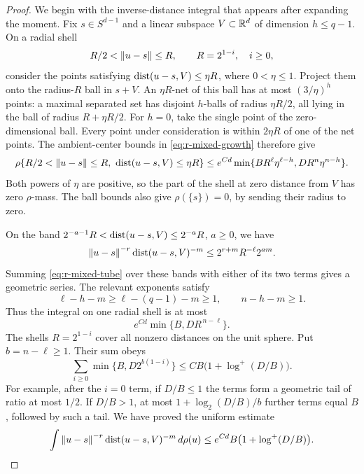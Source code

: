 \begin{proof}
We begin with the inverse-distance integral that appears after
expanding the moment.  Fix \(s\in S^{d-1}\) and a linear subspace
\(V\subset\mathbb R^d\) of dimension \(h\le q-1\).  On a radial shell
\[
 R/2<\left\lVert u-s\right\rVert\le R,\qquad R=2^{1-i},\quad i\ge0,
\]
consider the points satisfying
\(\operatorname{dist}(u-s,V)\le\eta R\), where \(0<\eta\le1\).  Project them
onto the radius-\(R\) ball in \(s+V\).  An \(\eta R\)-net of this
ball has at most \((3/\eta)^h\) points: a maximal separated set
has disjoint \(h\)-balls of radius \(\eta R/2\), all lying in the
ball of radius \(R+\eta R/2\).  For \(h=0\), take the single
point of the zero-dimensional ball.  Every point under consideration
is within \(2\eta R\) of one of the net points.  The ambient-center
bounds in \eqref{eq:r-mixed-growth} therefore give
\begin{equation}\label{eq:r-mixed-tube}
 \rho\{R/2<\left\lVert u-s\right\rVert\le R,\ \operatorname{dist}(u-s,V)\le\eta R\}
 \le e^{Cd}\min\{BR^\ell\eta^{\ell-h},
                         DR^n\eta^{n-h}\}.
\end{equation}
Both powers of \(\eta\) are positive, so the part of the shell at
zero distance from \(V\) has zero \(\rho\)-mass.  The ball bounds
also give \(\rho(\{s\})=0\), by sending their radius to zero.

On the band
\(2^{-a-1}R<\operatorname{dist}(u-s,V)\le2^{-a}R\), \(a\ge0\), we have
\[
 \left\lVert u-s\right\rVert^{-r}\operatorname{dist}(u-s,V)^{-m}
 \le 2^{r+m}R^{-\ell}2^{am}.
\]
Summing \eqref{eq:r-mixed-tube} over these bands with either of its
two terms gives a geometric series.  The relevant exponents satisfy
\[
 \ell-h-m\ge\ell-(q-1)-m\ge1,\qquad
 n-h-m\ge1.
\]
Thus the integral on one radial shell is at most
\[
 e^{Cd}\min\{B,DR^{\,n-\ell}\}.
\]
The shells \(R=2^{1-i}\) cover all nonzero distances on the unit
sphere.  Put \(b=n-\ell\ge1\).  Their sum obeys
\[
 \sum_{i\ge0}\min\{B,D2^{b(1-i)}\}
 \le C B\bigl(1+\log^+(D/B)\bigr).
\]
For example, after the \(i=0\) term, if \(D/B\le1\) the terms form
a geometric tail of ratio at most \(1/2\).  If \(D/B>1\), at most
\(1+\log_2(D/B)/b\) further terms equal \(B\), followed by such a
tail.  We have proved the uniform estimate
\begin{equation}\label{eq:r-mixed-inverse}
 \int\left\lVert u-s\right\rVert^{-r}\operatorname{dist}(u-s,V)^{-m}\,d\rho(u)
 \le e^{Cd}B\bigl(1+\log^+(D/B)\bigr).
\end{equation}


\end{proof}

